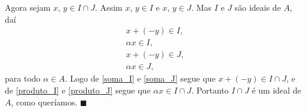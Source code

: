 \documentclass[12pt]{exam}
\renewcommand{\qedsymbol}{$\blacksquare$}
\begin{document}
\begin{enumerate}[label=({\arabic*})]
            Agora sejam $x$, $y \in I \cap J$. Assim $x$, $y \in I$ e $x$, $y \in J$. Mas $I$ e $J$ são ideais de $A$, daí
            \begin{align}
                x + (-y) \in I,\label{soma_I}\\
                \alpha x \in I,\label{produto_I}\\
                x + (-y) \in J,\label{soma_J}\\
                \alpha x \in J\label{produto_J},
            \end{align}
            para todo $\alpha \in A$. Logo de \eqref{soma_I} e \eqref{soma_J} segue que $x + (-y) \in I \cap J$, e de \eqref{produto_I} e
            \eqref{produto_J} segue que $\alpha x \in I \cap J$. Portanto $I \cap J$ é um ideal de $A$, como queríamos. \hspace{.1cm} \qedsymbol
    \end{enumerate}
\end{document}
